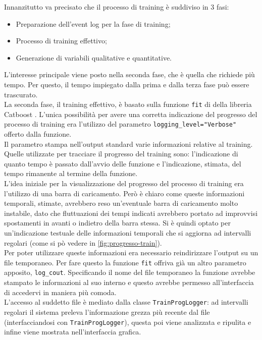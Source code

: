 Innanzitutto va precisato che il processo di training è suddiviso in 3 fasi:

\begin{itemize}
\item Preparazione dell'event log per la fase di training;

\item Processo di training effettivo;

\item Generazione di variabili qualitative e quantitative.

\end{itemize}
L'interesse principale viene posto nella seconda fase, che è quella che richiede più tempo. Per questo, il tempo impiegato dalla prima e dalla terza fase può essere trascurato.
\\
La seconda fase, il training effettivo, è basato sulla funzione \texttt{fit} di della libreria Catboost \cite{site:catboost-fit}. L'unica possibilità per avere una corretta indicazione del progresso del processo di training era l'utilizzo del parametro \texttt{logging\_level="Verbose"} offerto dalla funzione. 
\\
Il parametro stampa nell'output standard varie informazioni relative al training. Quelle utilizzate per tracciare il progresso del training sono: l'indicazione di quanto tempo è passato dall'avvio delle funzione e l'indicazione, stimata, del tempo rimanente al termine della funzione.
\\
L'idea iniziale per la visualizzazione del progresso del processo di training era l'utilizzo di una barra di caricamento.
Però è chiaro come queste informazioni temporali, stimate, avrebbero reso un'eventuale barra di caricamento molto instabile, dato che fluttuazioni dei tempi indicati avrebbero portato ad improvvisi spostamenti in avanti o indietro della barra stessa. Si è quindi optato per un'indicazione testuale delle informazioni temporali che si aggiorna ad intervalli regolari (come si pò vedere in \autoref{fig:progresso-train}).
\\
Per poter utilizzare queste informazioni era necessario reindirizzare l'output su un file temporaneo.  Per fare questo la funzione \texttt{fit} offriva già un altro parametro apposito, \texttt{log\_cout}. Specificando il nome del file temporaneo la funzione avrebbe stampato le informazioni al suo interno e questo avrebbe permesso all'interfaccia di accedervi in maniera più comoda.
\\
L'accesso al suddetto file è mediato dalla classe \texttt{TrainProgLogger}: ad intervalli regolari il sistema preleva l'informazione grezza più recente dal file (interfacciandosi con \texttt{TrainProgLogger}), questa poi viene analizzata e ripulita e infine viene mostrata nell'interfaccia grafica.


